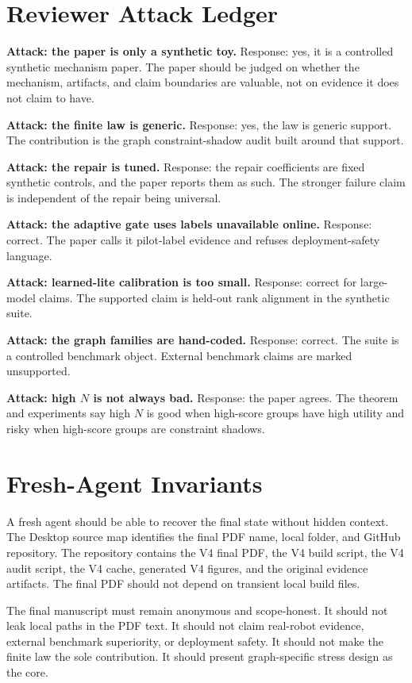 \documentclass{article}
\begin{document}
\section{Reviewer Attack Ledger}

\textbf{Attack: the paper is only a synthetic toy.}  Response: yes, it is a
controlled synthetic mechanism paper.  The paper should be judged on whether the
mechanism, artifacts, and claim boundaries are valuable, not on evidence it does
not claim to have.

\textbf{Attack: the finite law is generic.}  Response: yes, the law is generic
support.  The contribution is the graph constraint-shadow audit built around
that support.

\textbf{Attack: the repair is tuned.}  Response: the repair coefficients are
fixed synthetic controls, and the paper reports them as such.  The stronger
failure claim is independent of the repair being universal.

\textbf{Attack: the adaptive gate uses labels unavailable online.}  Response:
correct.  The paper calls it pilot-label evidence and refuses deployment-safety
language.

\textbf{Attack: learned-lite calibration is too small.}  Response: correct for
large-model claims.  The supported claim is held-out rank alignment in the
synthetic suite.

\textbf{Attack: the graph families are hand-coded.}  Response: correct.  The
suite is a controlled benchmark object.  External benchmark claims are marked
unsupported.

\textbf{Attack: high \(N\) is not always bad.}  Response: the paper agrees.
The theorem and experiments say high \(N\) is good when high-score groups have
high utility and risky when high-score groups are constraint shadows.

\section{Fresh-Agent Invariants}

A fresh agent should be able to recover the final state without hidden context.
The Desktop source map identifies the final PDF name, local folder, and GitHub
repository.  The repository contains the V4 final PDF, the V4 build script, the
V4 audit script, the V4 cache, generated V4 figures, and the original evidence
artifacts.  The final PDF should not depend on transient local build files.

The final manuscript must remain anonymous and scope-honest.  It should not
leak local paths in the PDF text.  It should not claim real-robot evidence,
external benchmark superiority, or deployment safety.  It should not make the
finite law the sole contribution.  It should present graph-specific stress
design as the core.
\end{document}
